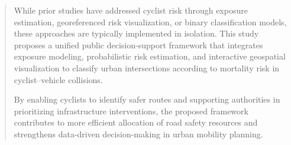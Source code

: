 \documentclass[preprint,12pt]{elsarticle}
\begin{document}
\begin{frontmatter}
\begin{abstract}
While prior studies have addressed cyclist risk through exposure estimation, georeferenced risk visualization, or binary classification models, these approaches are typically implemented in isolation. This study proposes a unified public decision-support framework that integrates exposure modeling, probabilistic risk estimation, and interactive geospatial visualization to classify urban intersections according to mortality risk in cyclist–vehicle collisions.

By enabling cyclists to identify safer routes and supporting authorities in prioritizing infrastructure interventions, the proposed framework contributes to more efficient allocation of road safety resources and strengthens data-driven decision-making in urban mobility planning.
\end{abstract}




\end{frontmatter}
\end{document}

